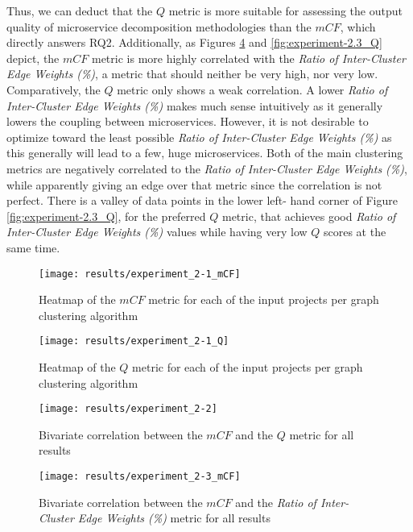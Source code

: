 \documentclass[12pt,a4paper]{report}
\begin{document}
Thus, we can deduct that the $Q$ metric is more suitable for assessing the
output quality of microservice decomposition methodologies than the $mCF$,
which directly answers RQ2. Additionally, as Figures \ref{fig:experiment-2.3_mCF}
and \ref{fig:experiment-2.3_Q} depict, the $mCF$ metric is more highly
correlated with the \textit{Ratio of Inter-Cluster Edge Weights (\%)}, a metric
that should neither be very high, nor very low. Comparatively, the $Q$ metric
only shows a weak correlation. A lower \textit{Ratio of Inter-Cluster Edge
Weights (\%)} makes much sense intuitively as it generally lowers the coupling
between microservices. However, it is not desirable to optimize toward the
least possible \textit{Ratio of Inter-Cluster Edge Weights (\%)} as this
generally will lead to a few, huge microservices. Both of the main clustering
metrics are negatively correlated to the \textit{Ratio of Inter-Cluster Edge
Weights (\%)}, while apparently giving an edge over that metric since the
correlation is not perfect. There is a valley of data points in the lower left\hyp
hand corner of Figure \ref{fig:experiment-2.3_Q}, for the preferred $Q$ metric,
that achieves good \textit{Ratio of Inter-Cluster Edge Weights (\%)} values
while having very low $Q$ scores at the same time.

\begin{figure}[htbp]
\centering
\texttt{[image: results/experiment\_2-1\_mCF]}
\caption{Heatmap of the $mCF$ metric for each of the input projects per graph clustering algorithm}
\label{fig:experiment-2.1_mCF}
\end{figure}

\begin{figure}[htbp]
\centering
\texttt{[image: results/experiment\_2-1\_Q]}
\caption{Heatmap of the $Q$ metric for each of the input projects per graph clustering algorithm}
\label{fig:experiment-2.1_Q}
\end{figure}

\begin{figure}[htbp]
\centering
\texttt{[image: results/experiment\_2-2]}
\caption{Bivariate correlation between the $mCF$ and the $Q$ metric for all results}
\label{fig:experiment-2.2}
\end{figure}

\begin{figure}[htbp]
\centering
\texttt{[image: results/experiment\_2-3\_mCF]}
\caption{Bivariate correlation between the $mCF$ and the \textit{Ratio of Inter-Cluster Edge Weights (\%)} metric for all results}
\label{fig:experiment-2.3_mCF}
\end{figure}
\end{document}

